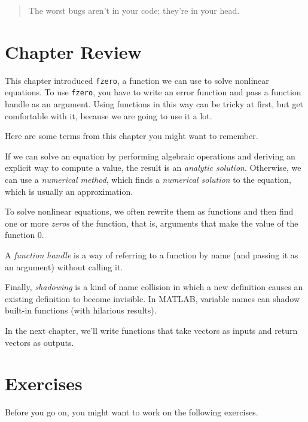 \begin{quote}
The worst bugs aren't in your code; they're in your head.
\end{quote}

\section{Chapter Review}

This chapter introduced \lstinline{fzero}, a function we can use to solve nonlinear equations.
To use \lstinline{fzero}, you have to write an error function and pass a function handle as an argument.  Using functions in this way can be tricky at first, but get comfortable with it, because we are going to use it a lot.

Here are some terms from this chapter you might want to remember.

If we can solve an equation by performing algebraic operations and deriving an explicit way to compute a value, the result is an \emph{analytic solution}.
Otherwise, we can use a \emph{numerical method}, which finds a \emph{numerical solution} to the equation, which is usually an approximation.

To solve nonlinear equations, we often rewrite them as functions and then find one or more \emph{zeros} of the function, that is, arguments that make the value of the function $0$.

A \emph{function handle} is a way of
referring to a function by name (and passing it as an argument)
without calling it.

Finally, \emph{shadowing} is a kind of name collision in which a new definition
causes an existing definition to become invisible.  In MATLAB,
variable names can shadow built-in functions (with hilarious results).

In the next chapter, we'll write functions that take vectors as inputs and return vectors as outputs.


\section{Exercises}

Before you go on, you might want to work on the following exercises.

